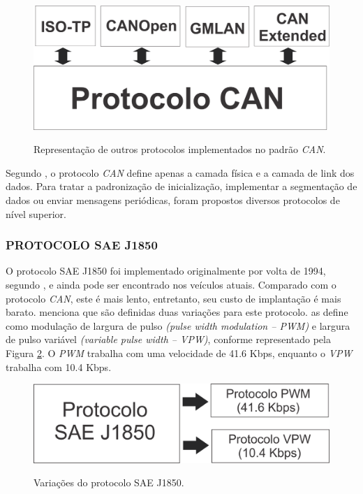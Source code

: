 \begin{figure}[!ht]
\centering
\caption{Representação de outros protocolos implementados no padrão \textit{CAN}.} 
{\includegraphics[scale=.25]{imagens/protocoloCanEVariacoes.png}}\\
 \label{Fig:implementacoes_can}
\end{figure}

Segundo , o protocolo \textit{CAN} define apenas a camada física e a camada de link dos dados. Para tratar a padronização de inicialização, implementar a segmentação de dados ou enviar mensagens periódicas, foram propostos diversos protocolos de nível superior.

\subsubsection{PROTOCOLO SAE J1850}
O protocolo SAE J1850 foi implementado originalmente por volta de 1994, segundo , e ainda pode ser encontrado nos veículos atuais. Comparado com o protocolo \textit{CAN}, este é mais lento, entretanto, seu custo de implantação é mais barato.  menciona que são definidas duas variações para este protocolo.  as define como modulação de largura de pulso \textit{(pulse width modulation – PWM)} e largura de pulso variável \textit{(variable pulse width – VPW)}, conforme representado pela Figura \ref{Fig:implementacoes_saej1850}. O \textit{PWM} trabalha com uma velocidade de 41.6 Kbps, enquanto o \textit{VPW} trabalha com 10.4 Kbps.

\begin{figure}[!ht]
\centering
\caption{Variações do protocolo SAE J1850.} 
{\includegraphics[scale=.25]{imagens/protocoloSaeJ1850.png}}\\
 \label{Fig:implementacoes_saej1850}
\end{figure}

